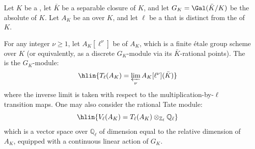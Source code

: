 \begin{definition} \label{definition:ell_adic_tate_module_of_an_abelian_variety}
    Let $K$ be a , let $\bar{K}$ be a separable closure of $K$, and let $G_K = \Gal(\bar{K}/K)$ be the absolute  of $K$. Let $A_K$ be an  over $K$, and let $\ell$ be a  that is distinct from the  of $K$.

    For any integer $\nu \geq 1$, let $A_K[\ell^\nu]$ be  of $A_K$, which is a finite étale group scheme over $K$ (or equivalently, as a discrete $G_K$-module via its $\bar{K}$-rational points). The  is the $G_K$-module:
    $$\hlin{T_\ell(A_K) = \varprojlim_{\nu} A_K[\ell^\nu](\bar{K})}$$
    where the inverse limit is taken with respect to the multiplication-by-$\ell$ transition maps. One may also consider the rational Tate module:
    $$\hlin{V_\ell(A_K) = T_\ell(A_K) \otimes_{\mathbb{Z}_\ell} \mathbb{Q}_\ell}$$
    which is a vector space over $\mathbb{Q}_\ell$ of dimension equal to the relative dimension of $A_K$, equipped with a continuous linear action of $G_K$.
\end{definition}

